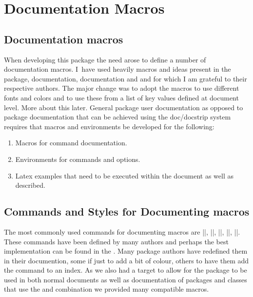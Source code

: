 \thispagestyle{plain}

\chapter{Documentation Macros}


\section{Documentation macros}

When developing this package the need arose to define a number of documentation macros. I~have used heavily macros and ideas present in the  package,  documentation,  documentation  and  and for which I am grateful to their respective authors. The major change was to adopt the macros to use different fonts and colors and to use these from a list of key values defined at document level. More about this later. General package user documentation as opposed to package documentation that can be achieved using the doc/docstrip system requires that macros and environments be developed for the following:

\begin{enumerate}
\item Macros for command documentation.
\item Environments for commands and options.
\item Latex examples that need to be executed within the document as well as described.
\end{enumerate}


\section{Commands and Styles for Documenting macros}

The most commonly used commands for documenting macros are |\cs|, |\cmd|, |\meta|, |\marg|, |\oarg|. These commands have been defined by many authors and perhaps the best implementation can be found in the . Many package authors have redefined them in their documention, some if just to add a bit of colour, others to have them add the command to an index. As we also had a target to allow for
the package to be used in both normal documents as well as documentation
of packages and classes that use the  and  combination we provided many compatible macros.

